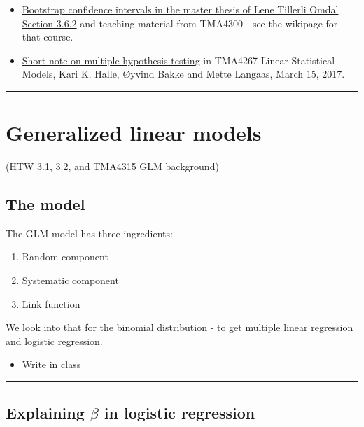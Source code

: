 \documentclass[
  letterpaper,
  DIV=11,
  numbers=noendperiod]{scrartcl}
\providecommand{\tightlist}{%
  \setlength{\itemsep}{0pt}\setlength{\parskip}{0pt}}\usepackage{longtable,booktabs,array}
\begin{document}
\begin{itemize}
\tightlist
\item
  \href{https://ntnuopen.ntnu.no/ntnu-xmlui/handle/11250/3026839}{Bootstrap
  confidence intervals in the master thesis of Lene Tillerli Omdal
  Section 3.6.2} and teaching material from TMA4300 - see the wikipage
  for that course.
\item
  \href{https://www.math.ntnu.no/emner/TMA4267/2017v/multtest.pdf}{Short
  note on multiple hypothesis testing} in TMA4267 Linear Statistical
  Models, Kari K. Halle, Øyvind Bakke and Mette Langaas, March 15, 2017.
\end{itemize}

\begin{center}\rule{0.5\linewidth}{0.5pt}\end{center}

\hypertarget{generalized-linear-models}{%
\section{Generalized linear models}\label{generalized-linear-models}}

(HTW 3.1, 3.2, and TMA4315 GLM background)

\hypertarget{the-model}{%
\subsection{The model}\label{the-model}}

The GLM model has three ingredients:

\begin{enumerate}
\def\labelenumi{\arabic{enumi})}
\tightlist
\item
  Random component
\item
  Systematic component
\item
  Link function
\end{enumerate}

We look into that for the binomial distribution - to get multiple linear
regression and logistic regression.

\begin{itemize}
\tightlist
\item
  Write in class
\end{itemize}

\begin{center}\rule{0.5\linewidth}{0.5pt}\end{center}

\hypertarget{explaining-beta-in-logistic-regression}{%
\subsection{\texorpdfstring{Explaining \(\beta\) in logistic
regression}{Explaining \textbackslash beta in logistic regression}}\label{explaining-beta-in-logistic-regression}}
\end{document}
